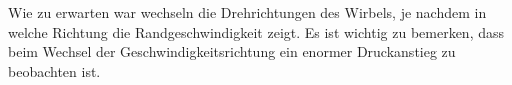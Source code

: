 		Wie zu erwarten war wechseln die Drehrichtungen des Wirbels, je nachdem in welche Richtung die Randgeschwindigkeit zeigt.
		Es ist wichtig zu bemerken, dass beim Wechsel der Geschwindigkeitsrichtung ein enormer Druckanstieg zu beobachten ist.


